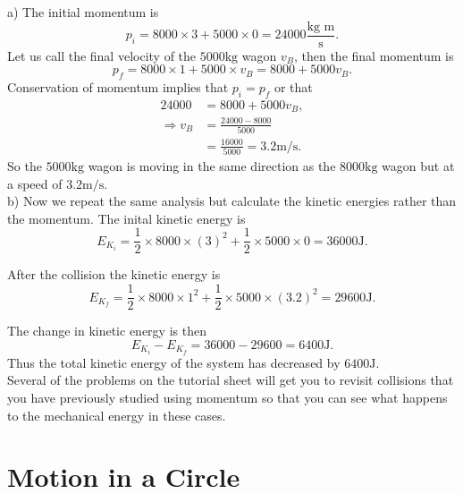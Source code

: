 \documentclass[a4paper,12pt]{book}
\begin{document}
a) The initial momentum is 
\begin{equation*}
p_{i}=8000\times 3 +5000\times 0=24 000\frac{\text{kg m}}{\text{s}}.
\end{equation*}
Let us call the final velocity of the $5000\text{kg}$ wagon $v_{B}$, then the final momentum is
\begin{equation*}
p_{f}=8000\times 1 +5000\times v_{B}=8000+5000v_{B}.
\end{equation*}
Conservation of momentum implies that $p_{i}=p_{f}$ or that
\begin{align*}
24 000&=8000+5000v_{B},\\
\Rightarrow v_{B}&=\frac{24000-8000}{5000}\\
&=\frac{16000}{5000}=3.2\text{m/s}.
\end{align*}
So the $5000\text{kg}$ wagon is moving in the same direction as the $8000\text{kg}$ wagon but at a speed of $3.2\text{m/s}$.\\

b) Now we repeat the same analysis but calculate the kinetic energies rather than the momentum. The inital kinetic energy is
\begin{equation*}
E_{K_{i}}=\frac{1}{2}\times 8000\times(3)^2 +\frac{1}{2}\times 5000\times 0=36000\text{J}.
\end{equation*}

After the collision the kinetic energy is
\begin{equation*}
E_{K_{f}}=\frac{1}{2}\times 8000\times 1^{2}+\frac{1}{2}\times 5000\times (3.2)^{2}=29 600\text{J}.
\end{equation*}

The change in kinetic energy is then
\begin{equation*}
E_{K_{i}}-E_{K_{f}}=36000-29600=6400\text{J}.
\end{equation*}
Thus the total kinetic energy of the system has decreased by $6400\text{J}$.\\


Several of the problems on the tutorial sheet will get you to revisit collisions that you have previously studied using momentum so that you can see what happens to the mechanical energy in these cases.



\chapter{Motion in a Circle}
\end{document}
